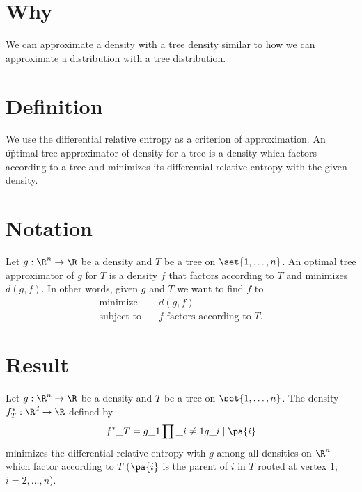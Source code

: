 
\section*{Why}

We can approximate a density with a tree density similar to how we can approximate a distribution with a tree distribution.

\section*{Definition}

We use the differential relative entropy as a criterion of approximation.
An \t{optimal tree approximator} of density for a tree is a density which factors according to a tree and minimizes its differential relative entropy with the given density.

\section*{Notation}

Let $g: \R ^n \to \R $ be a density and $T$ be a tree on $\set{1, \dots , n}$.
An optimal tree approximator of $g$ for $T$ is a density $f$ that factors according to $T$ and minimizes $d(g, f)$.
In other words, given $g$ and $T$ we want to find $f$ to
\[
\begin{aligned}
\text{minimize} &\quad d(g, f) \\
\text{subject to} &\quad f \text{ factors according to } T.
\end{aligned}
\]
  \section*{Result}


\begin{proposition}
Let $g: \R ^n \to \R $ be a density and $T$ be a tree on $\set{1, \dots , n}$.
The density $f^*_T: \R ^d \to \R $ defined by
$$
f^*\_T = g\_1 \prod\_{i \neq 1} g\_{i \mid \pa{i}}
$$
minimizes the differential relative entropy with $g$ among all densities on $\R ^n$ which factor according to $T$ ($\pa{i}$ is the parent of $i$ in $T$ rooted at vertex $1$, $i = 2, \dots , n$).

\end{proposition}


